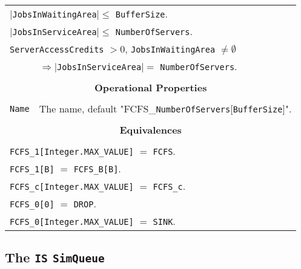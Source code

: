\documentclass[12pt]{book}
\begin{document}
\begin{tabular}{|l|l|l|l|}
\multicolumn{4}{|l|}{$|$\lstinline|JobsInWaitingArea|$| \leq$ \lstinline|BufferSize|.} \\
\multicolumn{4}{|l|}{$|$\lstinline|JobsInServiceArea|$| \leq$ \lstinline|NumberOfServers|.} \\
\multicolumn{4}{|l|}{\lstinline|ServerAccessCredits| $> 0$, \lstinline|JobsInWaitingArea| $\neq \emptyset$} \\
    \multicolumn{1}{|l}{}
  & \multicolumn{3}{l|}{$\Rightarrow |$\lstinline|JobsInServiceArea|$| =$ \lstinline|NumberOfServers|.} \\
\hline
\multicolumn{4}{|c|}{} \\
\multicolumn{4}{|c|}{\bf Operational Properties} \\
\multicolumn{4}{|c|}{} \\
\hline
\lstinline|Name| & \multicolumn{3}{|l|}{The name, default "FCFS\_\lstinline{NumberOfServers}[\lstinline|BufferSize|]".} \\
\hline
\multicolumn{4}{|c|}{} \\
\multicolumn{4}{|c|}{\bf Equivalences} \\
\multicolumn{4}{|c|}{} \\
\hline
\multicolumn{4}{|l|}{\lstinline|FCFS_1[Integer.MAX_VALUE]| $=$ \lstinline|FCFS|.} \\
\multicolumn{4}{|l|}{\lstinline|FCFS_1[B]| $=$ \lstinline|FCFS_B[B]|.} \\
\multicolumn{4}{|l|}{\lstinline|FCFS_c[Integer.MAX_VALUE]| $=$ \lstinline|FCFS_c|.} \\
\multicolumn{4}{|l|}{\lstinline|FCFS_0[0]| $=$ \lstinline|DROP|.} \\
\multicolumn{4}{|l|}{\lstinline|FCFS_0[Integer.MAX_VALUE]| $=$ \lstinline|SINK|.} \\
\hline
\end{tabular}

\subsection{The \lstinline{IS} \lstinline{SimQueue}}
\end{document}
